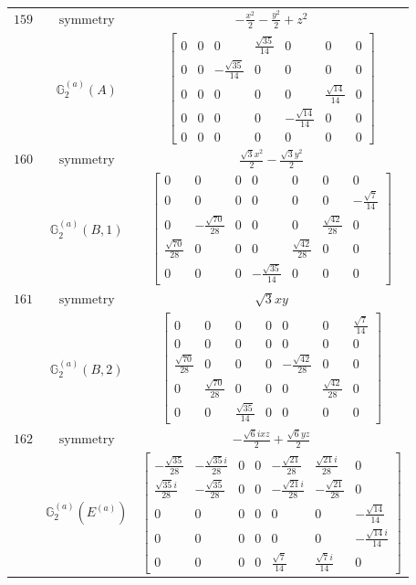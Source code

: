 \documentclass[fleqn,8pt,landscape]{jsarticle}
\begin{document}
\begin{longtable}{ccc}
$ 159 $ & $ \text{symmetry} $ & $ - \frac{x^{2}}{2} - \frac{y^{2}}{2} + z^{2} $ \\
$  $ & $ \mathbb{G}_{2}^{(a)}(A) $ & $ \begin{bmatrix} 0 & 0 & 0 & \frac{\sqrt{35}}{14} & 0 & 0 & 0 \\ 0 & 0 & - \frac{\sqrt{35}}{14} & 0 & 0 & 0 & 0 \\ 0 & 0 & 0 & 0 & 0 & \frac{\sqrt{14}}{14} & 0 \\ 0 & 0 & 0 & 0 & - \frac{\sqrt{14}}{14} & 0 & 0 \\ 0 & 0 & 0 & 0 & 0 & 0 & 0 \end{bmatrix} $ \\ \hline
$ 160 $ & $ \text{symmetry} $ & $ \frac{\sqrt{3} x^{2}}{2} - \frac{\sqrt{3} y^{2}}{2} $ \\
$  $ & $ \mathbb{G}_{2}^{(a)}(B,1) $ & $ \begin{bmatrix} 0 & 0 & 0 & 0 & 0 & 0 & 0 \\ 0 & 0 & 0 & 0 & 0 & 0 & - \frac{\sqrt{7}}{14} \\ 0 & - \frac{\sqrt{70}}{28} & 0 & 0 & 0 & \frac{\sqrt{42}}{28} & 0 \\ \frac{\sqrt{70}}{28} & 0 & 0 & 0 & \frac{\sqrt{42}}{28} & 0 & 0 \\ 0 & 0 & 0 & - \frac{\sqrt{35}}{14} & 0 & 0 & 0 \end{bmatrix} $ \\ \hline
$ 161 $ & $ \text{symmetry} $ & $ \sqrt{3} x y $ \\
$  $ & $ \mathbb{G}_{2}^{(a)}(B,2) $ & $ \begin{bmatrix} 0 & 0 & 0 & 0 & 0 & 0 & \frac{\sqrt{7}}{14} \\ 0 & 0 & 0 & 0 & 0 & 0 & 0 \\ \frac{\sqrt{70}}{28} & 0 & 0 & 0 & - \frac{\sqrt{42}}{28} & 0 & 0 \\ 0 & \frac{\sqrt{70}}{28} & 0 & 0 & 0 & \frac{\sqrt{42}}{28} & 0 \\ 0 & 0 & \frac{\sqrt{35}}{14} & 0 & 0 & 0 & 0 \end{bmatrix} $ \\ \hline
$ 162 $ & $ \text{symmetry} $ & $ - \frac{\sqrt{6} i x z}{2} + \frac{\sqrt{6} y z}{2} $ \\
$  $ & $ \mathbb{G}_{2}^{(a)}(E^{(a)}) $ & $ \begin{bmatrix} - \frac{\sqrt{35}}{28} & - \frac{\sqrt{35} i}{28} & 0 & 0 & - \frac{\sqrt{21}}{28} & \frac{\sqrt{21} i}{28} & 0 \\ \frac{\sqrt{35} i}{28} & - \frac{\sqrt{35}}{28} & 0 & 0 & - \frac{\sqrt{21} i}{28} & - \frac{\sqrt{21}}{28} & 0 \\ 0 & 0 & 0 & 0 & 0 & 0 & - \frac{\sqrt{14}}{14} \\ 0 & 0 & 0 & 0 & 0 & 0 & - \frac{\sqrt{14} i}{14} \\ 0 & 0 & 0 & 0 & \frac{\sqrt{7}}{14} & \frac{\sqrt{7} i}{14} & 0 \end{bmatrix} $ \\ \hline

\end{longtable}
\end{document}
